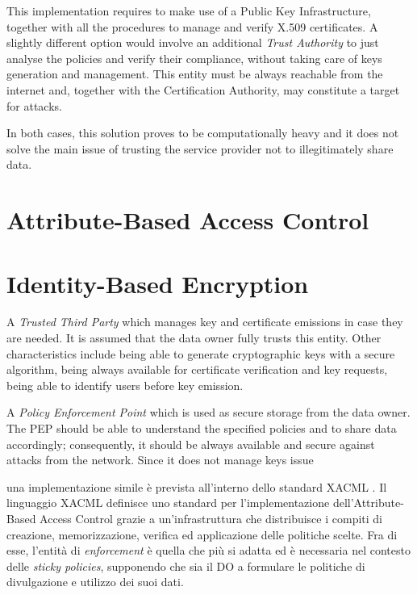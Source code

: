 This implementation requires to make use of a Public Key Infrastructure, together with all the procedures to manage and verify X.509 certificates. A slightly different option would involve an additional \textit{Trust Authority} to just analyse the policies and verify their compliance, without taking care of keys generation and management. This entity must be always reachable from the internet and, together with the Certification Authority, may constitute a target for attacks.

In both cases, this solution proves to be computationally heavy and it does not solve the main issue of trusting the service provider not to illegitimately share data.

\section{Attribute-Based Access Control}

\section{Identity-Based Encryption}
 
A \textit{Trusted Third Party} which manages key and certificate emissions in case they are needed. It is assumed that the data owner fully trusts this entity. Other characteristics include being able to generate cryptographic keys with a secure algorithm, being always available for certificate verification and key requests, being able to identify users before key emission.

A \textit{Policy Enforcement Point} which is used as secure storage from the data owner. The PEP should be able to understand the specified policies and to share data accordingly; consequently, it should be always available and secure against attacks from the network. Since it does not manage keys issue




 una implementazione simile \`e prevista all’interno dello standard XACML \cite{standard2005extensible}. Il linguaggio XACML definisce uno standard per l’implementazione dell’Attribute-Based Access Control grazie a un'infrastruttura che distribuisce i compiti di creazione, memorizzazione, verifica ed applicazione delle politiche scelte. Fra di esse, l’entit\`a di \textit{enforcement} \`e quella che pi\`u si adatta ed \`e necessaria nel contesto delle \textit{sticky policies}, supponendo che sia il DO a formulare le politiche di divulgazione e utilizzo dei suoi dati. 

